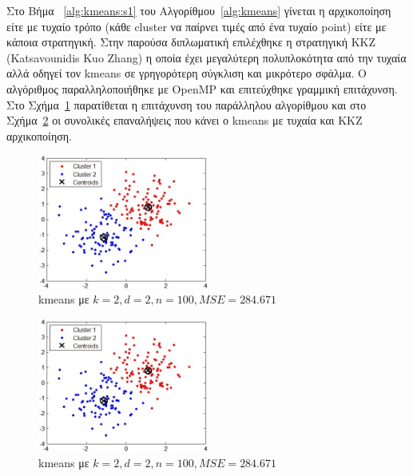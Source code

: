 \newpage

\indent Στο Βήμα ~\ref{alg:kmeans:s1} του Αλγορίθμου~\ref{alg:kmeans} γίνεται η αρχικοποίηση είτε με τυχαίο τρόπο (κάθε cluster να παίρνει τιμές από ένα τυχαίο point) είτε με κάποια στρατηγική. Στην παρούσα διπλωματική επιλέχθηκε η στρατηγική KKZ (Katsavounidis Kuo Zhang) η οποία έχει μεγαλύτερη πολυπλοκότητα από την τυχαία αλλά οδηγεί τον kmeans σε γρηγορότερη σύγκλιση και μικρότερο σφάλμα. Ο αλγόριθμος παραλληλοποιήθηκε με OpenMP και επιτεύχθηκε γραμμική επιτάχυνση. Στο Σχήμα~\ref{fig:kkzspeed} παρατίθεται η επιτάχυνση του παράλληλου αλγορίθμου και στο Σχήμα~\ref{fig:kkziter} οι συνολικές επαναλήψεις που κάνει ο kmeans με τυχαία και KKZ αρχικοποίηση.

\begin{figure}[ht!]
  \centering
  \includegraphics[width=0.5\textwidth]{chapter3/kmeans.jpg}
  \caption{kmeans με $k=2,d=2,n=100,MSE=284.671$}
  \label{fig:kkzspeed}
\end{figure}

\begin{figure}[ht!]
  \centering
  \includegraphics[width=0.5\textwidth]{chapter3/kmeans.jpg}
  \caption{kmeans με $k=2,d=2,n=100,MSE=284.671$}
  \label{fig:kkziter}
\end{figure}

\newpage

